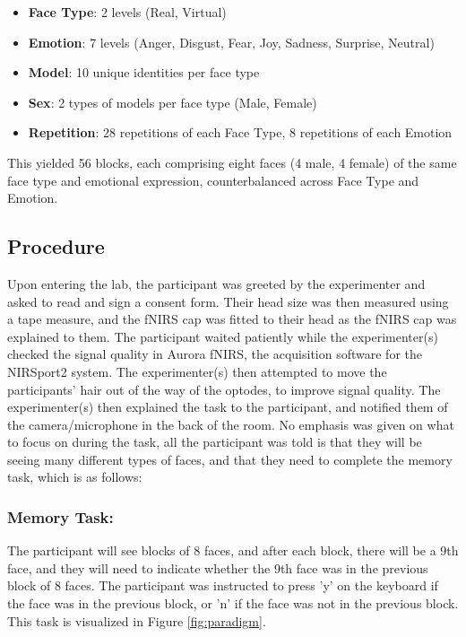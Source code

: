 \begin{itemize}
    \item \textbf{Face Type}: 2 levels (Real, Virtual)
    \item \textbf{Emotion}: 7 levels (Anger, Disgust, Fear, Joy, Sadness, Surprise, Neutral)
    \item \textbf{Model}: 10 unique identities per face type
    \item \textbf{Sex}: 2 types of models per face type (Male, Female)
    \item \textbf{Repetition}: 28 repetitions of each Face Type, 8 repetitions of each Emotion
\end{itemize}

This yielded 56 blocks, each comprising eight faces (4 male, 4 female) of the same face type and emotional expression, counterbalanced across Face Type and Emotion.

\subsection{Procedure}
\label{sec:Procedure}
Upon entering the lab, the participant was greeted by the experimenter and asked to read and sign a consent form. 
Their head size was then measured using a tape measure, and the fNIRS cap was fitted to their head as the fNIRS cap was explained to them.
The participant waited patiently while the experimenter(s) checked the signal quality in Aurora fNIRS, the acquisition software for the NIRSport2 system.
The experimenter(s) then attempted to move the participants' hair out of the way of the optodes, to improve signal quality.
The experimenter(s) then explained the task to the participant, and notified them of the camera/microphone in the back of the room. 
No emphasis was given on what to focus on during the task, all the participant was told is that they will be seeing many different types of faces, and that they need to complete the memory task, which is as follows:

\subsubsection{Memory Task:}
\label{sec:memory_task}
The participant will see blocks of 8 faces, and after each block, there will be a 9th face, and they will need to indicate whether the 9th face was in the previous block of 8 faces.
The participant was instructed to press 'y' on the keyboard if the face was in the previous block, or 'n' if the face was not in the previous block.
This task is visualized in Figure \ref{fig:paradigm}. 

